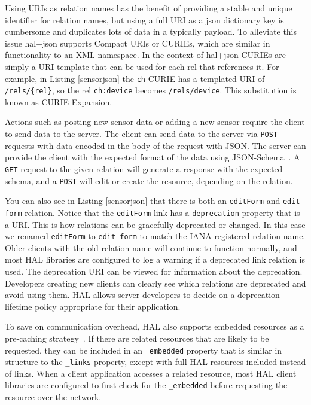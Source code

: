 \documentclass{acm_proc_article-sp}
\begin{document}
Using URIs as relation names has the benefit of providing a stable and unique
identifier for relation names, but using a full URI as a json dictionary key is
cumbersome and duplicates lots of data in a typically payload. To alleviate this
issue hal+json supports Compact URIs or CURIEs, which are similar in
functionality to an XML namespace. In the context of hal+json CURIEs are simply
a URI template that can be used for each rel that references it. For example,
in Listing \ref{sensorjson} the \texttt{ch} CURIE has a templated URI of
\texttt{/rels/\{rel\}}, so the rel \texttt{ch:device} becomes
\texttt{/rels/device}. This substitution is known as CURIE Expansion.

Actions such as posting new sensor data or adding a new sensor require the
client to send data to the server. The client can send data to the server via
\texttt{POST} requests with data encoded in the body of the request with JSON.
The server can provide the client with the expected format of the data using
JSON-Schema~\cite{json-schema-draft}. A \texttt{GET} request to the given
relation will generate a response with the expected schema, and a \texttt{POST}
will edit or create the resource, depending on the relation.

You can also see in Listing \ref{sensorjson} that there is both an
\texttt{editForm} and \texttt{edit-form} relation. Notice that the
\texttt{editForm} link has a \texttt{deprecation} property that is a URI.  This
is how relations can be gracefully deprecated or changed. In this case we
renamed \texttt{editForm} to \texttt{edit-form} to match the IANA-registered
relation name. Older clients with the old relation name will continue to
function normally, and most HAL libraries are configured to log a warning if a
deprecated link relation is used. The deprecation URI can be viewed for
information about the deprecation. Developers creating new clients can clearly
see which relations are deprecated and avoid using them. HAL allows server
developers to decide on a deprecation lifetime policy appropriate for their
application.

To save on communication overhead, HAL also supports embedded resources as a
pre-caching strategy~\cite{json-hal-draft}. If there are related resources that
are likely to be requested, they can be included in an \texttt{\_embedded}
property that is similar in structure to the \texttt{\_links} property, except
with full HAL resources included instead of links. When a client application
accesses a related resource, most HAL client libraries are configured to first
check for the \texttt{\_embedded} before requesting the resource over the
network.
\end{document}
